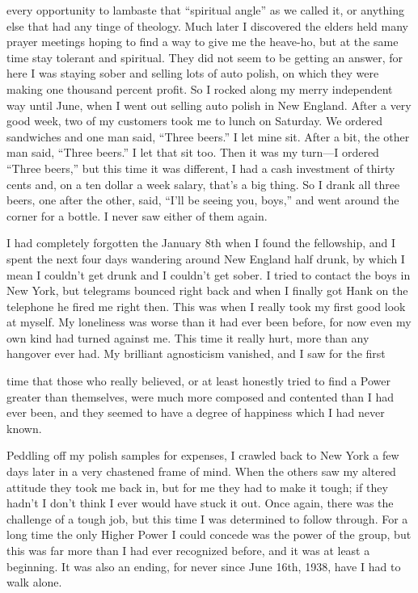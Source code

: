every opportunity to lambaste that “spiritual angle” as we called it, or anything else that had any tinge of theology. Much later I discovered the elders held many prayer meetings hoping to find a way to give me the heave-ho, but at the same time stay tolerant and spiritual. They did not seem to be getting an answer, for here I was staying sober and selling lots of auto polish, on which they were making one thousand percent profit. So I rocked along my merry independent way until June, when I went out selling auto polish in New England. After a very good week, two of my customers took me to lunch on Saturday. We ordered sandwiches and one man said, “Three beers.” I let mine sit. After a bit, the other man said, “Three beers.” I let that sit too. Then it was my turn—I ordered “Three beers,” but this time it was different, I had a cash investment of thirty cents and, on a ten dollar a week salary, that’s a big thing. So I drank all three beers, one after the other, said, “I’ll be seeing you, boys,” and went around the corner for a bottle. I never saw either of them again.

I had completely forgotten the January 8th when I found the fellowship, and I spent the next four days wandering around New England half drunk, by which I mean I couldn’t get drunk and I couldn’t get sober. I tried to contact the boys in New York, but telegrams bounced right back and when I finally got Hank on the telephone he fired me right then. This was when I really took my first good look at myself. My loneliness was worse than it had ever been before, for now even my own kind had turned against me. This time it really hurt, more than any hangover ever had. My brilliant agnosticism vanished, and I saw for the first

time that those who really believed, or at least honestly tried to find a Power greater than themselves, were much more composed and contented than I had ever been, and they seemed to have a degree of happiness which I had never known.

Peddling off my polish samples for expenses, I crawled back to New York a few days later in a very chastened frame of mind. When the others saw my altered attitude they took me back in, but for me they had to make it tough; if they hadn’t I don’t think I ever would have stuck it out. Once again, there was the challenge of a tough job, but this time I was determined to follow through. For a long time the only Higher Power I could concede was the power of the group, but this was far more than I had ever recognized before, and it was at least a beginning. It was also an ending, for never since June 16th, 1938, have I had to walk alone.

